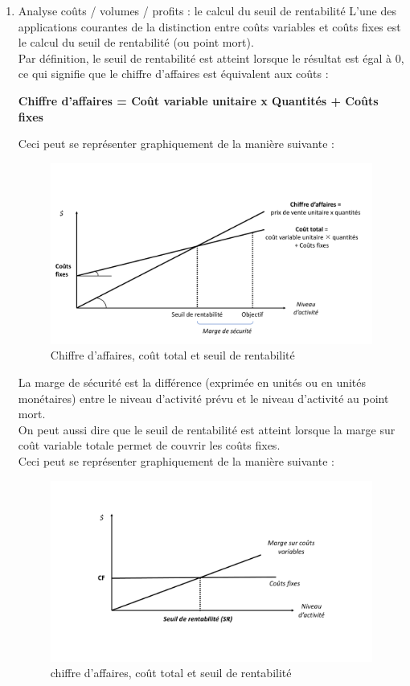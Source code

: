 \documentclass{tufte-handout}
\begin{document}
\begin{enumerate}
\item Analyse coûts / volumes / profits : le calcul du seuil de rentabilité
\label{sec:org5e5aec0}
L'une des applications courantes de la distinction entre coûts variables et coûts fixes est le calcul du seuil de rentabilité (ou point mort).\\
Par définition, le seuil de rentabilité est atteint lorsque le résultat est égal à 0, ce qui signifie que le chiffre d'affaires est équivalent aux coûts :\\
\begin{center}
\textbf{Chiffre d'affaires = Coût variable unitaire x Quantités + Coûts fixes}\\
\end{center}
Ceci peut se représenter graphiquement de la manière suivante :\\
\begin{figure}[htbp]
\centering
\includegraphics[width=.9\linewidth]{./img/srcact.pdf}
\caption{Chiffre d'affaires, coût total et seuil de rentabilité}
\end{figure}
La marge de sécurité est la différence (exprimée en unités ou en unités monétaires) entre le niveau d'activité prévu et le niveau d'activité au point mort.\\

On peut aussi dire que le seuil de rentabilité est atteint lorsque la marge sur coût variable totale permet de couvrir les coûts fixes.\\
Ceci peut se représenter graphiquement de la manière suivante :\\
\begin{figure}[htbp]
\centering
\includegraphics[width=.9\linewidth]{./img/srmcvcf.pdf}
\caption{chiffre d'affaires, coût total et seuil de rentabilité}
\end{figure}


\end{enumerate}
\end{document}
